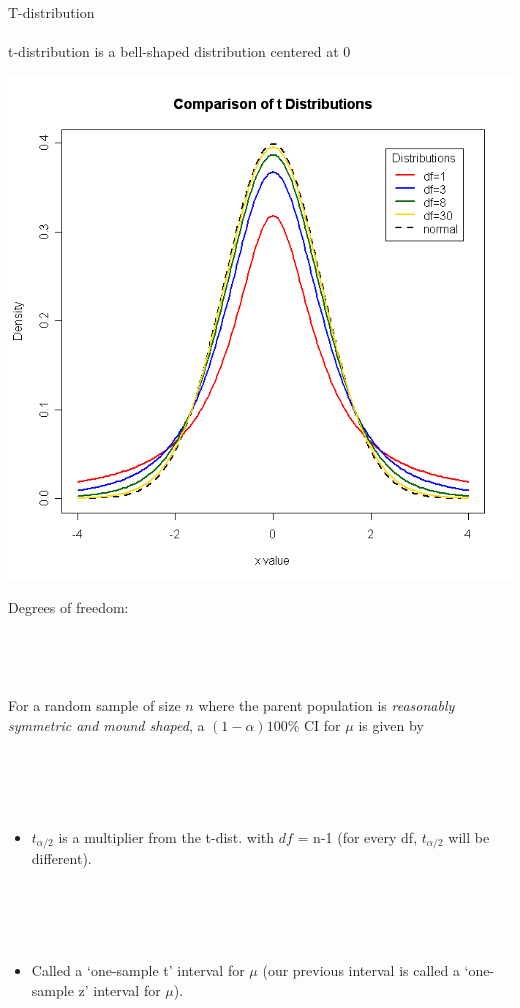 \large T-distribution \normalsize \\~\\
t-distribution is a bell-shaped distribution centered at 0
\begin{flushright}
\includegraphics[scale=0.45]{tdist}
\end{flushright}

Degrees of freedom:\\~\\~\\~\\~\\

For a random sample of size $n$ where the parent population is \textit{reasonably symmetric and mound shaped}, a \large $(1-\alpha)100$\% CI for $\mu$ \normalsize is given by\\~\\~\\~\\~\\

\begin{itemize}
\item $t_{\alpha/2}$ is a multiplier from the t-dist. with $df$ = n-1 (for every df, $t_{\alpha/2}$ will be different).\\~\\~\\~\\~\\
\item Called a `one-sample t' interval for $\mu$ (our previous interval is called a `one-sample z' interval for $\mu$).
\end{itemize}


